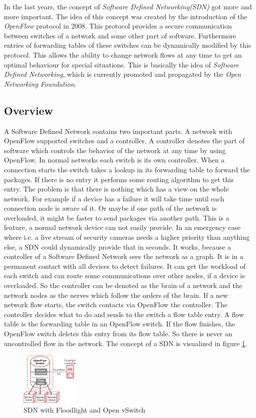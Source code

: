 In the last years, the concept of \textit{Software Defined Networking(SDN)} got more and more important. The idea of this concept was created by the introduction of the \textit{OpenFlow} protocol in 2008\cite{Mc2008}. This protocol provides a secure communication between switches of a network and some other part of software. Furthermore entries of forwarding tables of these switches can be dynamically modified by this protocol. This allows the ability to change network flows at any time to get an optimal behaviour for special situations. This is basically the idea of \textit{Software Defined Networking}, which is currently promoted and propagated by the \textit{Open Networking Foundation}\cite{onf}. 
\subsection{Overview}
A Software Defined Network contains two important parts. A network with OpenFlow supported switches and a controller. A controller denotes the part of software which controls the behavior of the network at any time by using OpenFlow. In normal networks each switch is its own controller. When a connection starts the switch takes a lookup in its forwarding table to forward the packages. If there is no entry it performs some routing algorithm to get this entry. The problem is that there is nothing which has a view on the whole network. For example if a device has a failure it will take time until each connection node is aware of it. Or maybe if one path of the network is overloaded, it might be faster to send packages via another path. This is a feature, a normal network device can not easily provide. In an emergency case where i.e. a live stream of security cameras needs a higher priority than anything else, a SDN could dynamically provide that in seconds. It works, because a controller of a Software Defined Network sees the network as a graph. It is in a permanent contact with all devices to detect failures. It can get the workload of each switch and can route some communications over other nodes, if a device is overloaded. So the controller can be denoted as the brain of a network and the network nodes as the nerves which follow the orders of the brain. If a new network flow starts, the switch contacts via OpenFlow the controller. The controller decides what to do and sends to the switch a flow table entry. A flow table is the forwarding table in an OpenFlow switch. If the flow finishes, the OpenFlow switch deletes this entry from its flow table. So there is never an uncontrolled flow in the network. The concept of a SDN is visualized in figure \ref{sdn}.\\
\begin{figure}[ht]
\centering
\includegraphics[width=0.25\textwidth]{img/sdn} 

\caption{SDN with Floodlight and Open vSwitch}
\label{sdn}
\end{figure}
 

